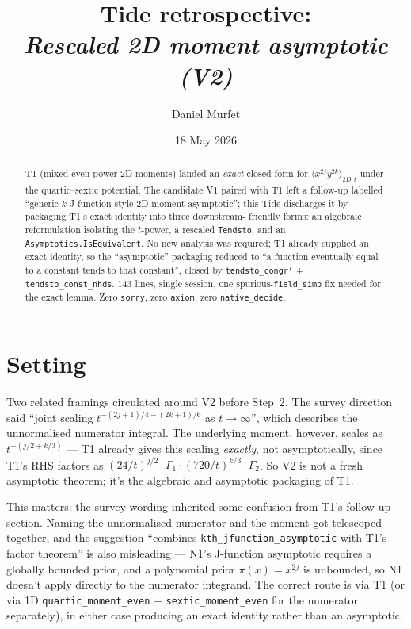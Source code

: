\documentclass[11pt]{article}
\title{Tide retrospective:\\\emph{Rescaled 2D moment asymptotic (V2)}}
\author{Daniel Murfet}
\date{18 May 2026}
\begin{document}
\maketitle

\begin{abstract}
T1 (mixed even-power 2D moments) landed an \emph{exact} closed form
for $\langle x^{2j} y^{2k}\rangle_{2D, t}$ under the quartic--sextic
potential. The candidate V1 paired with T1 left a follow-up labelled
``generic-$k$ J-function-style 2D moment asymptotic''; this Tide
discharges it by packaging T1's exact identity into three downstream-
friendly forms: an algebraic reformulation isolating the $t$-power,
a rescaled \texttt{Tendsto}, and an
\texttt{Asymptotics.IsEquivalent}. No new analysis was required;
T1 already supplied an exact identity, so the ``asymptotic''
packaging reduced to ``a function eventually equal to a constant
tends to that constant'', closed by \texttt{tendsto\_congr'} +
\texttt{tendsto\_const\_nhds}. 143 lines, single session, one
spurious-\texttt{field\_simp} fix needed for the exact lemma. Zero
\texttt{sorry}, zero \texttt{axiom}, zero \texttt{native\_decide}.
\end{abstract}

\section{Setting}

Two related framings circulated around V2 before Step~2. The survey
direction said ``joint scaling $t^{-(2j+1)/4 - (2k+1)/6}$ as $t \to
\infty$'', which describes the unnormalised numerator integral. The
underlying moment, however, scales as $t^{-(j/2 + k/3)}$ --- T1
already gives this scaling \emph{exactly}, not asymptotically, since
T1's RHS factors as $(24/t)^{j/2}\cdot \Gamma_1\cdot(720/t)^{k/3}\cdot
\Gamma_2$. So V2 is not a fresh asymptotic theorem; it's the
algebraic and asymptotic packaging of T1.

This matters: the survey wording inherited some confusion from T1's
follow-up section. Naming the unnormalised numerator and the moment
got telescoped together, and the suggestion ``combines
\texttt{kth\_jfunction\_asymptotic} with T1's factor theorem'' is
also misleading --- N1's J-function asymptotic requires a globally
bounded prior, and a polynomial prior $\pi(x) = x^{2j}$ is unbounded,
so N1 doesn't apply directly to the numerator integrand. The correct
route is via T1 (or via 1D \texttt{quartic\_moment\_even} +
\texttt{sextic\_moment\_even} for the numerator separately), in
either case producing an exact identity rather than an asymptotic.
\end{document}
